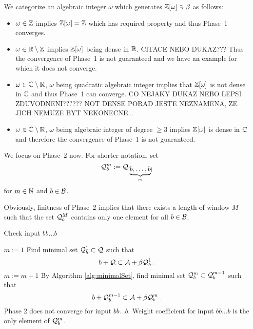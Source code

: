 We categorize an algebraic integer $\omega$ which generates $\mathbb{Z}[\omega] \ni \beta$ as follows:
\begin{itemize}
    \item $\omega \in \mathbb{Z}$ implies $\mathbb{Z}[\omega]=\mathbb{Z}$ which has required property and thus Phase~1 converges.
    \item $\omega \in \mathbb{R}\setminus\mathbb{Z}$ implies $\mathbb{Z}[\omega]$ being dense in $\mathbb{R}$. CITACE NEBO DUKAZ??? Thus the convergence of Phase~1 is not guaranteed and we have an example for which it does not converge.
    \item $\omega \in \mathbb{C}\setminus\mathbb{R}$, $\omega$ being quadratic algebraic integer implies that $\mathbb{Z}[\omega]$ is not dense in $\mathbb{C}$ and thus Phase~1 can converge. CO NEJAKY DUKAZ NEBO LEPSI ZDUVODNENI?????? NOT DENSE PORAD JESTE NEZNAMENA, ZE JICH NEMUZE BYT NEKONECNE...
    \item $\omega \in \mathbb{C}\setminus\mathbb{R}$, $\omega$ being algebraic integer of degree $\geq 3$ implies $\mathbb{Z}[\omega]$ is  dense in $\mathbb{C}$ and therefore the convergence of Phase~1 is not guaranteed.
\end{itemize}

We focus on Phase~2 now. For shorter notation, set 
$$
\mathcal{Q}^m_b:=\mathcal{Q}_{[\underbrace{b,\dots,b}_m]}
$$ for $m \in \mathbb{N}$ and $b\in\mathcal{B}$.

Obviously, finitness of Phase~2 implies that there exists a length of window $M$ such that the set $\mathcal{Q}^M_b$ contains only one element for all $b\in\mathcal{B}$. 

\begin{algorithm}
  \caption{Check input $bb\dots b$}
    \label{alg:oneletterSets}
  \begin{algorithmic}[1]
    \STATE $m:=1$
    \STATE Find minimal set $\mathcal{Q}^1_b \subset \mathcal{Q}$ such that
      $$
      b + \mathcal{Q} \subset \mathcal{A} + \beta \mathcal{Q}^1_b\,.
      $$
      \vspace{-20pt}
        \STATE $m:= m +1$
        \STATE By Algorithm \ref{alg:minimalSet}, find minimal set $\mathcal{Q}^m_b \subset \mathcal{Q}^{m-1}_b$ such that
          $$
          b + \mathcal{Q}^{m-1}_b \subset \mathcal{A} + \beta \mathcal{Q}^m_b\,.
          $$  
          \vspace{-20pt}
            \RETURN Phase 2 does not converge for input $bb\dots b$.
        \ENDIF
    \ENDWHILE  
    \RETURN Weight coefficient for input $bb\dots b$ is the only element of $\mathcal{Q}^m_b$.
  \end{algorithmic}
\end{algorithm}

